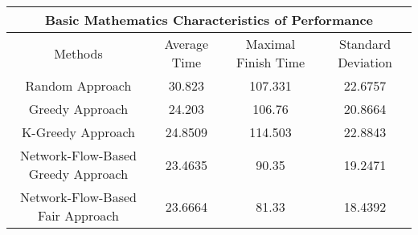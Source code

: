 \begin{tabular}{|c|c|c|c|}
\hline
\multicolumn{4}{|c|}{Basic Mathematics Characteristics of Performance} \bigstrut\\
\hline
Methods & Average Time & Maximal Finish Time & Standard Deviation \bigstrut\\
\hline
Random Approach & 30.823 & 107.331 & 22.6757 \bigstrut\\
\hline
Greedy Approach & 24.203 & 106.76 & 20.8664 \bigstrut\\
\hline
K-Greedy Approach & 24.8509 & 114.503 & 22.8843 \bigstrut\\
\hline
Network-Flow-Based Greedy Approach & 23.4635 & 90.35 & 19.2471 \bigstrut\\
\hline
Network-Flow-Based Fair Approach & 23.6664 & 81.33 & 18.4392 \bigstrut\\
\hline
\end{tabular}%
